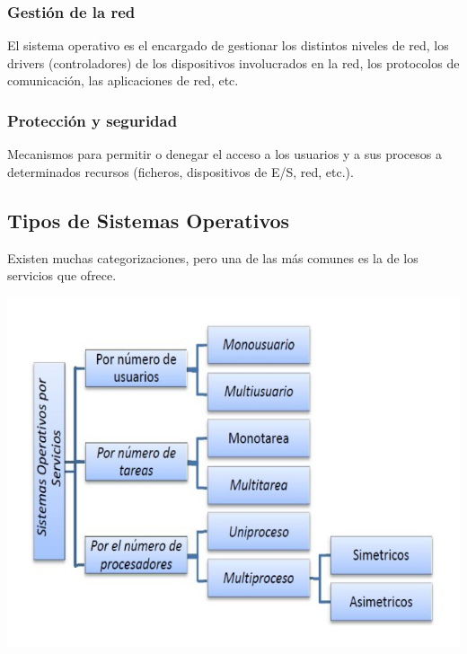 \documentclass[11pt]{article}
\begin{document}
\subsubsection{Gestión de la red}
\label{sec:org49e363a}
El sistema operativo es el encargado de gestionar los distintos niveles
de red, los drivers (controladores) de los dispositivos involucrados en
la red, los protocolos de comunicación, las aplicaciones de red, etc.

\subsubsection{Protección y seguridad}
\label{sec:org7226944}
Mecanismos para permitir o denegar el acceso a los usuarios y a sus
procesos a determinados recursos (ficheros, dispositivos de E/S, red,
etc.).

\newpage
\subsection{Tipos de Sistemas Operativos}
\label{sec:orga8aca67}
Existen muchas categorizaciones, pero una de las más comunes es la de
los servicios que ofrece.

\begin{center}
\includegraphics[width=.9\linewidth]{ArquitecturaSistemaOperativo/SO_Tipos.PNG}
\end{center}
\end{document}

